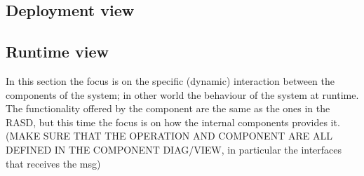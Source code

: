 \subsection{Deployment view}

\subsection{Runtime view}

In this section the focus is on the specific (dynamic) interaction between the components of the system; in other world the behaviour of the system at runtime.
The functionality offered by the component are the same as the ones in the RASD, but this time the focus is on how the internal components provides it.
(MAKE SURE THAT THE OPERATION AND COMPONENT ARE ALL DEFINED IN THE COMPONENT DIAG/VIEW, in particular the interfaces that receives the msg)


